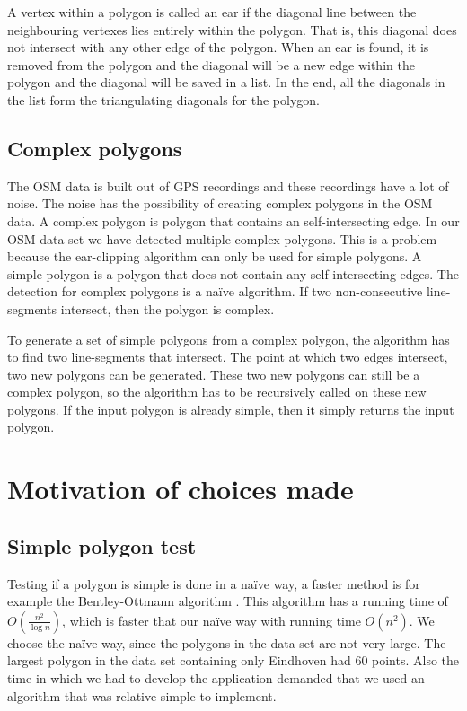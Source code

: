 A vertex within a polygon is called an ear if the diagonal line between the neighbouring vertexes lies entirely within the polygon. That is, this diagonal does not intersect with any other edge of the polygon. When an ear is found, it is removed from the polygon and the diagonal will be a new edge within the polygon and the diagonal will be saved in a list. In the end, all the diagonals in the list form the triangulating diagonals for the polygon.

\subsection{Complex polygons}
\label{subsec:ComplexPolygons}
The OSM data is built out of GPS recordings and these recordings have a lot of noise. The noise has the possibility of creating complex polygons in the OSM data. A complex polygon is polygon that contains an self-intersecting edge. In our OSM data set we have detected multiple complex polygons. This is a problem because the ear-clipping algorithm can only be used for simple polygons. A simple polygon is a polygon that does not contain any self-intersecting edges. The detection for complex polygons is a naïve algorithm. If two non-consecutive line-segments intersect, then the polygon is complex.

To generate a set of simple polygons from a complex polygon, the algorithm has to find two line-segments that intersect. The point at which two edges intersect, two new polygons can be generated. These two new polygons can still be a complex polygon, so the algorithm has to be recursively called on these new polygons. If the input polygon is already simple, then it simply returns the input polygon.

\section{Motivation of choices made}
\label{sec:MotivationOfChoicesMade}
\subsection{Simple polygon test}
\label{subsec:SimplePolygonTest}
Testing if a polygon is simple is done in a naïve way, a faster method is for example the Bentley-Ottmann algorithm \cite{Bentley79}. This algorithm has a running time of $O(\frac{n^2}{\log{n}})$, which is faster that our naïve way with running time $O(n^2)$. We choose the naïve way, since the polygons in the data set are not very large. The largest polygon in the data set containing only Eindhoven had 60 points. Also the time in which we had to develop the application demanded that we used an algorithm that was relative simple to implement.

